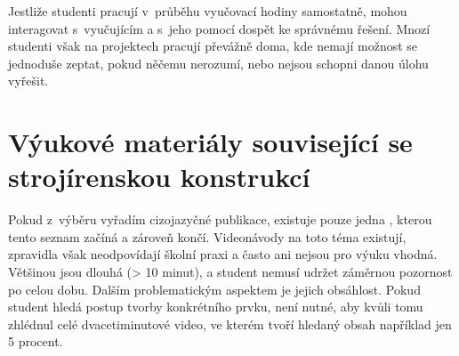     Jestliže studenti pracují v~průběhu vyučovací hodiny samostatně, mohou interagovat s~vyučujícím a s~jeho pomocí dospět ke správnému řešení.
    Mnozí studenti však na projektech pracují převážně doma, kde nemají možnost se jednoduše zeptat, pokud něčemu nerozumí, nebo nejsou schopni danou úlohu vyřešit.

\section{Výukové materiály související se strojírenskou konstrukcí}
    Pokud z~výběru vyřadím cizojazyčné publikace, existuje pouze jedna , kterou tento seznam začíná a zároveň končí. 
    Videonávody na toto téma existují, zpravidla však neodpovídají školní praxi a často ani nejsou pro výuku vhodná.
    Většinou jsou dlouhá (> 10 minut), a student nemusí udržet záměrnou pozornost po celou dobu.
    Dalším problematickým aspektem je jejich obsáhlost.
    Pokud student hledá postup tvorby konkrétního prvku, není nutné, aby kvůli tomu zhlédnul celé dvacetiminutové video, ve kterém tvoří hledaný obsah například jen 5 procent. 
